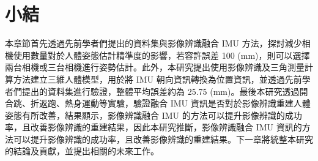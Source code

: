
\section{小結}
本章節首先透過先前學者們提出的資料集與影像辨識融合 IMU 方法，探討減少相機使用數量對於人體姿態估計精準度的影響，若容許誤差 100 (mm)，則可以選擇兩台相機或三台相機進行姿勢估計。此外，本研究提出使用影像辨識及三角測量計算方法建立三維人體模型，用於將 IMU 朝向資訊轉換為位置資訊，並透過先前學者們提出的資料集進行驗證，整體平均誤差約為 25.75 (mm)。最後本研究透過開合跳、折返跑、熱身運動等實驗，驗證融合 IMU 資訊是否對於影像辨識重建人體姿態有所改善，結果顯示，影像辨識融合 IMU 的方法可以提升影像辨識的成功率，且改善影像辨識的重建結果，因此本研究推斷，影像辨識融合 IMU 資訊的方法可以提升影像辨識的成功率，且改善影像辨識的重建結果。下一章將統整本研究的結論及貢獻，並提出相關的未來工作。

\clearpage